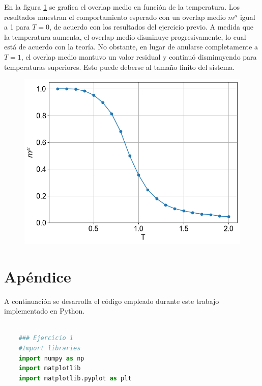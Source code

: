 \documentclass[aps,prb,twocolumn,superscriptaddress,floatfix,longbibliography]{revtex4-2}
\newcounter{para}
\begin{document}
En la figura \ref{fig:ej2_overlap_vs_T} se grafica el overlap medio en función de la temperatura. Los resultados muestran el comportamiento esperado con un overlap medio \( m^\mu \) igual a 1 para \( T = 0 \), de acuerdo con los resultados del ejercicio previo. A medida que la temperatura aumenta, el overlap medio disminuye progresivamente, lo cual está de acuerdo con la teoría. No obstante, en lugar de anularse completamente a \( T = 1 \), el overlap medio mantuvo un valor residual y continuó disminuyendo para temperaturas superiores. Esto puede deberse al tamaño finito del sistema.

\begin{figure}[h]
  \includegraphics[clip=true,width=\columnwidth]{../ej2_overlap_vs_T.png}
  \caption{}
   \label{fig:ej2_overlap_vs_T}
\end{figure}





\onecolumngrid


\section*{Apéndice}
A continuación se desarrolla el código empleado durante este trabajo implementado en Python.




\begin{lstlisting}[language=Python]
    
    ### Ejercicio 1
    #Import libraries
    import numpy as np
    import matplotlib
    import matplotlib.pyplot as plt
    
\end{lstlisting}


\end{document}
